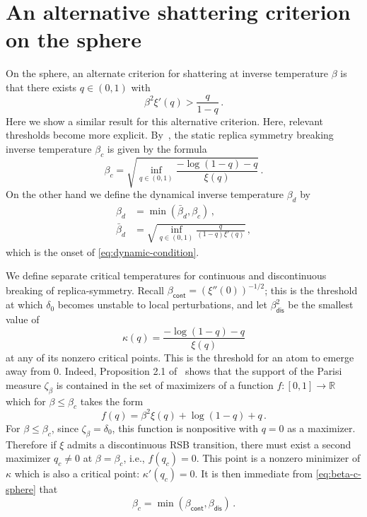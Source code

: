 \documentclass[11pt]{article}
\theoremstyle{definition}
\numberwithin{equation}{section}
\def\R{{\mathbb R}}
\newcommand{\<}{\langle}
\renewcommand{\>}{\rangle}
\def\cont{{\mathsf{cont}}}
\def\dis{{\mathsf{dis}}}
\begin{document}
\section{An alternative shattering criterion on the sphere}
\label{sec:spherical}


On the sphere, an alternate criterion for shattering at inverse temperature $\beta$ is that there exists $q\in (0,1)$ with 
\begin{equation}
\label{eq:dynamic-condition}
    \beta^2 \xi'(q)>\frac{q}{1-q} \,. 
\end{equation}
Here we show a similar result for this alternative criterion.
Here, relevant thresholds become more explicit. By~\cite[Proposition 2.3]{talagrand2006spherical}, the static replica symmetry breaking inverse temperature $\beta_c$ is given by the formula
\begin{equation}
\label{eq:beta-c-sphere}
\beta_c
=
\sqrt{\inf_{q \in (0, 1)} \frac{-\log(1-q)-q}{\xi(q)}}\,.
\end{equation}
On the other hand we define the dynamical inverse temperature $\beta_d$ by
\begin{align*}
\beta_d
&=
\min(\bar\beta_d,\beta_c)\,,
\\
\bar\beta_d
&=
\sqrt{\inf_{q \in (0, 1)} \frac{q}{(1-q)\xi'(q)}}\,, 
\end{align*}
which is the onset of \eqref{eq:dynamic-condition}.


We define separate critical temperatures for continuous and discontinuous breaking of replica-symmetry.
Recall $\beta_{\cont}= (\xi''(0))^{-1/2}$; this is the threshold at which $\delta_0$ becomes unstable to local perturbations, and let $\beta_{\dis}^2$ be the smallest value of 
\begin{equation}\label{eq:kappa}
\kappa(q)
=
\frac{-\log(1-q)-q}{\xi(q)}
\end{equation}
at any of its nonzero critical points.
This is the threshold for an atom to emerge away from $0$. Indeed, Proposition 2.1 of~\cite{talagrand2006spherical} shows that the support of the Parisi measure $\zeta_{\beta}$ is contained in the set of maximizers of a function $f: [0,1]\to \R$ which for $\beta \le \beta_c$ takes the form   
\begin{equation}\label{eq:f}
f(q) = \beta^2 \xi(q) + \log(1-q)+q\,.
\end{equation}
For $\beta \le \beta_c$, since $\zeta_{\beta} = \delta_0$, this function is nonpositive with $q=0$ as a maximizer. Therefore if $\xi$ admits a discontinuous RSB transition, there must exist a second maximizer $q_c \neq 0$ at $\beta = \beta_c$, i.e., $f(q_c) = 0$. This point is a nonzero  minimizer of $\kappa$ which is also a critical point: $\kappa'(q_c)=0$.      
%
It is then immediate from \eqref{eq:beta-c-sphere} that 
\[
\beta_c
=
\min(\beta_{\cont},\beta_{\dis})\,.
\]
\end{document}
